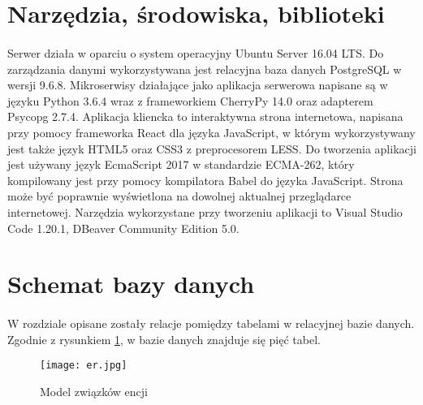 \documentclass{article}
\begin{document}
	\section{Narzędzia, środowiska, biblioteki}
	\paragraph{}Serwer działa w oparciu o system operacyjny Ubuntu Server 16.04 LTS.
	Do zarządzania danymi wykorzystywana jest relacyjna baza danych PostgreSQL w wersji 9.6.8.
	Mikroserwisy działające jako aplikacja serwerowa napisane są w języku Python 3.6.4 wraz z frameworkiem CherryPy 14.0 oraz adapterem Psycopg 2.7.4.
	Aplikacja kliencka to interaktywna strona internetowa, napisana przy pomocy frameworka React dla języka JavaScript, w którym wykorzystywany jest także język HTML5 oraz CSS3 z preprocesorem LESS. Do tworzenia aplikacji jest używany język EcmaScript 2017 w standardzie ECMA-262, który kompilowany jest przy pomocy kompilatora Babel do języka JavaScript. Strona może być poprawnie wyświetlona na dowolnej aktualnej przeglądarce internetowej.
	Narzędzia wykorzystane przy tworzeniu aplikacji to Visual Studio Code 1.20.1, DBeaver Community Edition 5.0.
	\section{Schemat bazy danych}
	\paragraph{} W rozdziale opisane zostały relacje pomiędzy tabelami w relacyjnej bazie danych. Zgodnie z rysunkiem \ref{fig:er}, w bazie danych znajduje się pięć tabel.
	\begin{figure}[H]
		\centering
		\texttt{[image: er.jpg]}
		\caption[]{Model związków encji}
		\label{fig:er}
	\end{figure}
	
\end{document}
